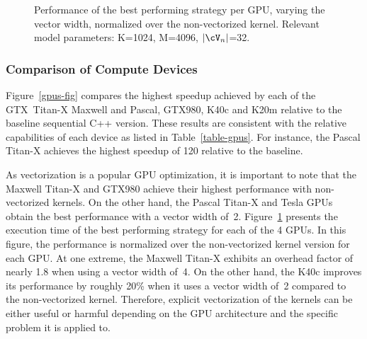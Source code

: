 \begin{figure}[tb]	%
  \centering
  \caption{Performance of the best performing strategy per GPU, varying the
  vector width, normalized over the non-vectorized kernel. Relevant model
  parameters: K=1024, M=4096, $|\Neighbors|$=32.}
  \label{gpus-v-sweep}
\end{figure}

\subsubsection{Comparison of Compute Devices}
Figure~\ref{gpus-fig} compares the highest speedup achieved by each of the
GTX~\mbox{Titan-X} Maxwell and Pascal, GTX980, K40c and K20m relative to the baseline
sequential C++ version. These results are consistent with the relative
capabilities of each device as listed in Table~\ref{table-gpus}. For instance,
the Pascal \mbox{Titan-X} achieves the highest speedup of 120 relative to the baseline.

As vectorization is a popular GPU optimization, it is important to note that
the Maxwell \mbox{Titan-X} and GTX980 achieve their highest performance with non-vectorized kernels.
On the other hand, the Pascal \mbox{Titan-X} and Tesla GPUs obtain the best performance with a vector
width of~2. Figure~\ref{gpus-v-sweep} presents the execution time of the best
performing strategy for each of the 4 GPUs. In this figure, the performance is
normalized over the non-vectorized kernel version for each GPU. At one extreme,
the Maxwell \mbox{Titan-X} exhibits an overhead factor of nearly 1.8 when using a vector
width of~4. On the other hand, the K40c improves its performance by roughly
20\% when it uses a vector width of~2 compared to the non-vectorized kernel.
Therefore, explicit vectorization of the kernels can be either useful or
harmful depending on the GPU architecture and the specific problem it is
applied to.



